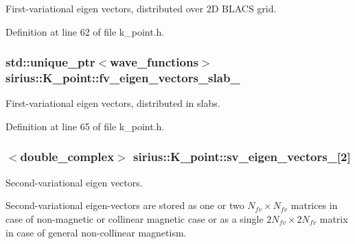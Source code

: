 First-\/variational eigen vectors, distributed over 2\+D B\+L\+A\+C\+S grid. 



Definition at line 62 of file k\+\_\+point.\+h.

\hypertarget{classsirius_1_1_k__point_a0fcc8ce86cb2b8fa713b1101fadd8098}{}
\subsubsection[{fv\+\_\+eigen\+\_\+vectors\+\_\+slab\+\_\+}]{\setlength{\rightskip}{0pt plus 5cm}std\+::unique\+\_\+ptr$<${\bf wave\+\_\+functions}$>$ sirius\+::\+K\+\_\+point\+::fv\+\_\+eigen\+\_\+vectors\+\_\+slab\+\_\+\hspace{0.3cm}{\ttfamily [private]}}\label{classsirius_1_1_k__point_a0fcc8ce86cb2b8fa713b1101fadd8098}


First-\/variational eigen vectors, distributed in slabs. 



Definition at line 65 of file k\+\_\+point.\+h.

\hypertarget{classsirius_1_1_k__point_afb5d65a6fb66c2532aefe946a0513eea}{}
\subsubsection[{sv\+\_\+eigen\+\_\+vectors\+\_\+}]{$<$double\+\_\+complex$>$ sirius\+::\+K\+\_\+point\+::sv\+\_\+eigen\+\_\+vectors\+\_\+\mbox{[}2\mbox{]}\hspace{0.3cm}{\ttfamily [private]}}\label{classsirius_1_1_k__point_afb5d65a6fb66c2532aefe946a0513eea}


Second-\/variational eigen vectors. 

Second-\/variational eigen-\/vectors are stored as one or two $ N_{fv} \times N_{fv} $ matrices in case of non-\/magnetic or collinear magnetic case or as a single $ 2 N_{fv} \times 2 N_{fv} $ matrix in case of general non-\/collinear magnetism. 

